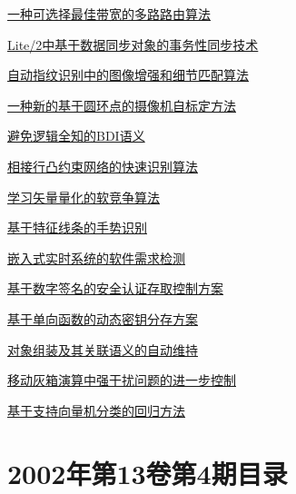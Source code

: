 \documentclass[a4paper]{article}
\begin{document}
\href{http://www.jos.org.cn/ch/reader/download_pdf.aspx?file_no=20020508&year_id=2002&quarter_id=5&falg=1}{一种可选择最佳带宽的多路路由算法}

\href{http://www.jos.org.cn/ch/reader/download_pdf.aspx?file_no=20020509&year_id=2002&quarter_id=5&falg=1}{Lite/2中基于数据同步对象的事务性同步技术}

\href{http://www.jos.org.cn/ch/reader/download_pdf.aspx?file_no=20020510&year_id=2002&quarter_id=5&falg=1}{自动指纹识别中的图像增强和细节匹配算法}

\href{http://www.jos.org.cn/ch/reader/download_pdf.aspx?file_no=20020511&year_id=2002&quarter_id=5&falg=1}{一种新的基于圆环点的摄像机自标定方法}

\href{http://www.jos.org.cn/ch/reader/download_pdf.aspx?file_no=20020512&year_id=2002&quarter_id=5&falg=1}{避免逻辑全知的BDI语义}

\href{http://www.jos.org.cn/ch/reader/download_pdf.aspx?file_no=20020513&year_id=2002&quarter_id=5&falg=1}{相接行凸约束网络的快速识别算法}

\href{http://www.jos.org.cn/ch/reader/download_pdf.aspx?file_no=20020514&year_id=2002&quarter_id=5&falg=1}{学习矢量量化的软竞争算法}

\href{http://www.jos.org.cn/ch/reader/download_pdf.aspx?file_no=20020515&year_id=2002&quarter_id=5&falg=1}{基于特征线条的手势识别}

\href{http://www.jos.org.cn/ch/reader/download_pdf.aspx?file_no=20020516&year_id=2002&quarter_id=5&falg=1}{嵌入式实时系统的软件需求检测}

\href{http://www.jos.org.cn/ch/reader/download_pdf.aspx?file_no=20020517&year_id=2002&quarter_id=5&falg=1}{基于数字签名的安全认证存取控制方案}

\href{http://www.jos.org.cn/ch/reader/download_pdf.aspx?file_no=20020518&year_id=2002&quarter_id=5&falg=1}{基于单向函数的动态密钥分存方案}

\href{http://www.jos.org.cn/ch/reader/download_pdf.aspx?file_no=20020519&year_id=2002&quarter_id=5&falg=1}{对象组装及其关联语义的自动维持}

\href{http://www.jos.org.cn/ch/reader/download_pdf.aspx?file_no=20020520&year_id=2002&quarter_id=5&falg=1}{移动灰箱演算中强干扰问题的进一步控制}

\href{http://www.jos.org.cn/ch/reader/download_pdf.aspx?file_no=20020521&year_id=2002&quarter_id=5&falg=1}{基于支持向量机分类的回归方法}


\section{\textbf{2002年第13卷第4期目录}}
\end{document}
